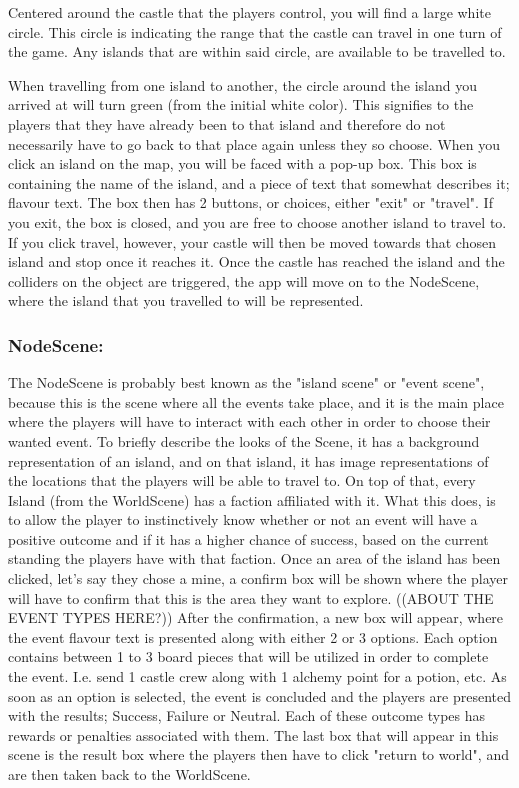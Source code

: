 Centered around the castle that the players control, you will find a large white circle. This circle is indicating the range that the castle can travel in one turn of the game. Any islands that are within said circle, are available to be travelled to.

When travelling from one island to another, the circle around the island you arrived at will turn green (from the initial white color). This signifies to the players that they have already been to that island and therefore do not necessarily have to go back to that place again unless they so choose. 
When you click an island on the map, you will be faced with a pop-up box. This box is containing the name of the island, and a piece of text that somewhat describes it; flavour text. The box then has 2 buttons, or choices, either "exit" or "travel". If you exit, the box is closed, and you are free to choose another island to travel to. If you click travel, however, your castle will then be moved towards that chosen island and stop once it reaches it. 
Once the castle has reached the island and the colliders on the object are triggered, the app will move on to the NodeScene, where the island that you travelled to will be represented.
\subsubsection{NodeScene:}
\label{sec:nodeScene}
The NodeScene is probably best known as the "island scene" or "event scene", because 
this is the scene where all the events take place, and it is the main place where the players will have to interact with each other in order to choose their wanted event. 
To briefly describe the looks of the Scene, it has a background representation of an island, and on that island, it has image representations of the locations that the players will be able to travel to. On top of that, every Island (from the WorldScene) has a faction affiliated with it. What this does, is to allow the player to instinctively know whether or not an event will have a positive outcome and if it has a higher chance of success, based on the current standing the players have with that faction.
Once an area of the island has been clicked, let's say they chose a mine, a confirm box will be shown where the player will have to confirm that this is the area they want to explore. ((ABOUT THE EVENT TYPES HERE?))
After the confirmation, a new box will appear, where the event flavour text is presented along with either 2 or 3 options. Each option contains between 1 to 3 board pieces that will be utilized in order to complete the event. I.e. send 1 castle crew along with 1 alchemy point for a potion, etc. As soon as an option is selected, the event is concluded and the players are presented with the results; Success, Failure or Neutral. Each of these outcome types has rewards or penalties associated with them.
The last box that will appear in this scene is the result box where the players then have to click "return to world", and are then taken back to the WorldScene. \\
